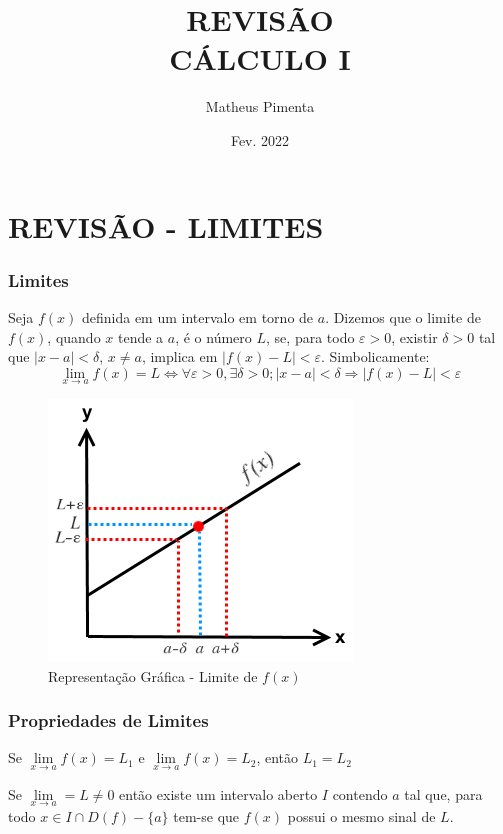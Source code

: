 \documentclass[hyperref={pdfpagelabels=false}]{beamer}
\title{REVISÃO \\ CÁLCULO I}
\author[Matheus Pimenta]{Matheus Pimenta}
\institute[UEL]{\normalsize Universidade Estadual de Londrina \\
	Londrina
}
\date{Fev. 2022}
\begin{document}
\section{REVISÃO - LIMITES}
\begin{frame}
\frametitle{Limites}

\begin{definition}[Limites]
	Seja $f(x)$ definida em um intervalo em torno de $a$. Dizemos que o limite de $f(x)$, quando $x$ tende a $a$, é o número $L$, se, para todo $\varepsilon > 0$, existir $\delta > 0$ tal que $|x-a|< \delta$, $x \neq a$, implica em $|f(x)-L|<\varepsilon$. Simbolicamente:
	$$\lim\limits_{x \rightarrow a}f(x) = L \Leftrightarrow \forall \varepsilon > 0, \exists \delta > 0 ; |x-a| < \delta \Rightarrow |f(x) - L| < \varepsilon$$
\end{definition}

\pause

\begin{figure}[!h]
	\centering
	\includegraphics[scale=0.4]{lim}
	\caption{Representação Gráfica - Limite de $f(x)$}
	\label{graflim}
\end{figure}

\end{frame}


\begin{frame}
\frametitle{Propriedades de Limites}
\begin{theorem}
	Se $\lim\limits_{x \rightarrow a}f(x) = L_1$ e $\lim\limits_{x \rightarrow a}f(x) = L_2$, então $L_1 = L_2$
\end{theorem}

\pause

\begin{theorem}
	Se $\lim\limits_{x \rightarrow a} = L \neq 0$ então existe um intervalo aberto $I$ contendo $a$ tal que, para todo $x \in I \cap D(f)-\{a\}$ tem-se que $f(x)$ possui o mesmo sinal de $L$.
\end{theorem}
\end{frame}
\end{document}
